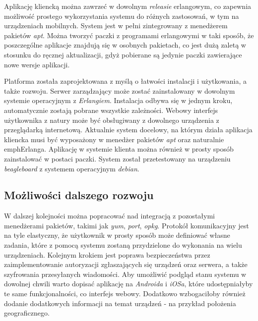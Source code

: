 \documentclass[polish,12pt]{aghthesis}
\begin{document}
Aplikację kliencką można zawrzeć w dowolnym \emph{releasie} erlangowym, co zapewnia możliwość prostego wykorzystania systemu do różnych zastosowań, w tym na urządzeniach mobilnych. System jest w pełni zintegrowany z menedżerem pakietów \emph{apt}. Można tworzyć paczki z programami erlangowymi w taki sposób, że poszczególne aplikacje znajdują się w osobnych pakietach, co jest dużą zaletą w stosunku do ręcznej aktualizacji, gdyż pobierane są jedynie paczki zawierające nowe wersje aplikacji.

Platforma została zaprojektowana z myślą o łatwości instalacji i użytkowania, a także rozwoju. Serwer zarządzający może zostać zainstalowany w dowolnym systemie operacyjnym z \emph{Erlangiem}. Instalacja odbywa się w jednym kroku, automatycznie zostają pobrane wszystkie zależności. Webowy interfejs użytkownika z natury może być obsługiwany z dowolnego urządzenia z przeglądarką internetową. Aktualnie system docelowy, na którym działa aplikacja kliencka musi być wyposażony w menedżer pakietów \emph{apt} oraz naturalnie emph{Erlanga}. Aplikację w systemie klienta można również w prosty sposób zainstalować w postaci paczki. System został przetestowany na urządzeniu \emph{beagleboard} z systemem operacyjnym \emph{debian}.

\subsection*{Możliwości dalszego rozwoju}
W dalszej kolejności można popracować nad integracją z pozostałymi menedżerami pakietów, takimi jak \emph{yum}, \emph{port}, \emph{opkg}. Protokół komunikacyjny jest na tyle elastyczny, że użytkownik w prosty sposób może definiować własne zadania, które z pomocą systemu zostaną przydzielone do wykonania na wielu urządzeniach. Kolejnym krokiem jest poprawa bezpieczeństwa przez zaimplementowanie autoryzacji zgłaszających się urządzeń oraz serwera, a także szyfrowania przesyłanych wiadomości. Aby umożliwić podgląd stanu systemu w dowolnej chwili warto dopisać aplikację na \emph{Androida} i \emph{iOSa}, które udostępniałyby te same funkcjonalności, co interfejs webowy. Dodatkowo wzbogaciłoby również dodanie dodatkowych informacji na temat urządzeń - na przykład położenia geograficznego.
\end{document}
